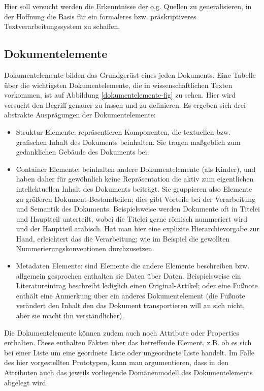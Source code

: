 Hier soll versucht werden die Erkenntnisse der o.g. Quellen zu generalisieren, in der Hoffnung die Basis für ein formaleres bzw. präskriptiveres Textverarbeitungssystem zu schaffen.

 
\subsection{Dokumentelemente}\label{dokumentelemente}
 
Dokumentelemente bilden das Grundgerüst eines jeden Dokuments. Eine Tabelle über die wichtigsten Dokumentelemente, die in wissenschaftlichen Texten vorkommen, ist auf Abbildung \ref{dokumentelemente-fig} zu sehen. Hier wird versucht den Begriff genauer zu fassen und zu definieren. Es ergeben sich drei abstrakte Ausprägungen der Dokumentelemente:

 
\begin{itemize}

\item Struktur Elemente: repräsentieren Komponenten, die textuellen bzw. grafischen Inhalt des Dokuments beinhalten. Sie tragen maßgeblich zum gedanklichen Gebäude des Dokuments bei.
\item Container Elemente: beinhalten andere Dokumentelemente (als Kinder), und haben daher für gewöhnlich keine Repräsentation die aktiv zum eigentlichen intellektuellen Inhalt des Dokuments beiträgt. Sie gruppieren also Elemente zu größeren Dokument-Bestandteilen; dies gibt Vorteile bei der Verarbeitung und Semantik des Dokuments. Beispielsweise werden Dokumente oft in Titelei und Hauptteil unterteilt, wobei die Titelei gerne römisch nummeriert wird und der Hauptteil arabisch. Hat man hier eine explizite Hierarchievorgabe zur Hand, erleichtert das die Verarbeitung; wie im Beispiel die gewollten Nummerierungskonventionen durchzusetzen.
\item Metadaten Elemente: sind Elemente die andere Elemente beschreiben bzw. allgemein gesprochen enthalten sie Daten über Daten. Beispielsweise ein Literatureintrag beschreibt lediglich einen Original-Artikel; oder eine Fußnote enthält eine Anmerkung über ein anderes Dokumentelement (die Fußnote verändert den Inhalt den das Dokument transportieren will an sich nicht, aber sie macht ihn verständlicher).
\end{itemize}
 
Die Dokumentelemente können zudem auch noch Attribute oder Properties enthalten. Diese enthalten Fakten über das betreffende Element, z.B. ob es sich bei einer Liste um eine geordnete Liste oder ungeordnete Liste handelt. Im Falle des hier vorgestellten Prototypen, kann man argumentieren, dass in den Attributen auch das jeweils vorliegende Domänenmodell des Dokumentelements abgelegt wird.


